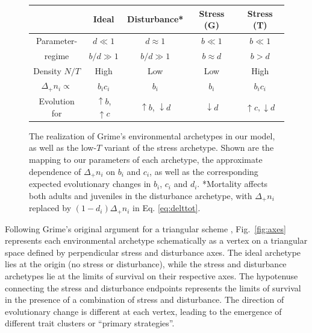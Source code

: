 \documentclass[11pt]{article}
\begin{document}
\begin{figure}
\centering
\begin{tabular}{*{5}{c}}
  & Ideal & Disturbance* & Stress (G) & Stress (T) \\ \hline
  Parameter- & $d \ll 1$ & $d \approx 1$ & $b \ll 1$ & $b \ll 1$ \\
  regime & $b/d\gg 1$ & $b/d\gg 1$ & $b\approx d$ & $b>d$ \\
  Density $N/T$  & High & Low & Low & High \\
  $\Delta_+ n_i\propto$ & $b_i c_i$ & $b_i$ & $b_i$ & $b_i c_i$ \\
  Evolution for & $\uparrow b$, $ \uparrow c$ & $\uparrow b$, $\downarrow d$ & $\downarrow d$ & $\uparrow c, \downarrow d$
\end{tabular}
\caption{\label{fig:table} The realization of Grime's environmental archetypes in our model, as well as the low-$T$ variant of the stress archetype. Shown are the mapping to our parameters of each archetype, the approximate dependence of $\Delta_+ n_i$ on $b_i$ and $c_i$, as well as the corresponding expected evolutionary changes in $b_i$, $c_i$ and $d_i$. *Mortality affects both adults and juveniles in the disturbance archetype, with $\Delta_+ n_i$ replaced by $(1-d_i)\Delta_+ n_i$ in Eq. \eqref{eq:delttot}.}
\end{figure}

Following Grime's original argument for a triangular scheme \citep{grime_1977}, Fig.~\ref{fig:axes} represents each environmental archetype schematically as a vertex on a triangular space defined by perpendicular stress and disturbance axes. The ideal archetype lies at the origin (no stress or disturbance), while the stress and disturbance archetypes lie at the limits of survival on their respective axes. The hypotenuse connecting the stress and disturbance endpoints represents the limits of survival in the presence of a combination of stress and disturbance. The direction of evolutionary change is different at each vertex, leading to the emergence of different trait clusters or ``primary strategies''. 
\end{document}
